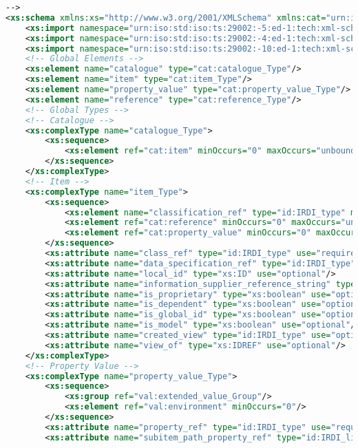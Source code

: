 \begin{lstlisting}[caption=catalogue.xsd, language=XML, label=lst:catalogue_xsd]
-->
<xs:schema xmlns:xs="http://www.w3.org/2001/XMLSchema" xmlns:cat="urn:iso:std:iso:ts:29002:-10:ed-1:tech:xml-schema:catalogue" xmlns:val="urn:iso:std:iso:ts:29002:-10:ed-1:tech:xml-schema:value" xmlns:bas="urn:iso:std:iso:ts:29002:-4:ed-1:tech:xml-schema:basic" xmlns:id="urn:iso:std:iso:ts:29002:-5:ed-1:tech:xml-schema:identifier" targetNamespace="urn:iso:std:iso:ts:29002:-10:ed-1:tech:xml-schema:catalogue" elementFormDefault="qualified">
	<xs:import namespace="urn:iso:std:iso:ts:29002:-5:ed-1:tech:xml-schema:identifier" schemaLocation="identifier.xsd"/>
	<xs:import namespace="urn:iso:std:iso:ts:29002:-4:ed-1:tech:xml-schema:basic" schemaLocation="basic.xsd"/>
	<xs:import namespace="urn:iso:std:iso:ts:29002:-10:ed-1:tech:xml-schema:value" schemaLocation="value.xsd"/>
	<!-- Global Elements -->
	<xs:element name="catalogue" type="cat:catalogue_Type"/>
	<xs:element name="item" type="cat:item_Type"/>
	<xs:element name="property_value" type="cat:property_value_Type"/>
	<xs:element name="reference" type="cat:reference_Type"/>
	<!-- Global Types -->
	<!-- Catalogue -->
	<xs:complexType name="catalogue_Type">
		<xs:sequence>
			<xs:element ref="cat:item" minOccurs="0" maxOccurs="unbounded"/>
		</xs:sequence>
	</xs:complexType>
	<!-- Item -->
	<xs:complexType name="item_Type">
		<xs:sequence>
			<xs:element name="classification_ref" type="id:IRDI_type" minOccurs="0" maxOccurs="unbounded"/>
			<xs:element ref="cat:reference" minOccurs="0" maxOccurs="unbounded"/>
			<xs:element ref="cat:property_value" minOccurs="0" maxOccurs="unbounded"/>
		</xs:sequence>
		<xs:attribute name="class_ref" type="id:IRDI_type" use="required"/>
		<xs:attribute name="data_specification_ref" type="id:IRDI_type" use="optional"/>
		<xs:attribute name="local_id" type="xs:ID" use="optional"/>
		<xs:attribute name="information_supplier_reference_string" type="xs:string" use="optional"/>
		<xs:attribute name="is_proprietary" type="xs:boolean" use="optional"/>
		<xs:attribute name="is_dependent" type="xs:boolean" use="optional"/>
		<xs:attribute name="is_global_id" type="xs:boolean" use="optional"/>
		<xs:attribute name="is_model" type="xs:boolean" use="optional"/>
		<xs:attribute name="created_view" type="id:IRDI_type" use="optional"/>
		<xs:attribute name="view_of" type="xs:IDREF" use="optional"/>
	</xs:complexType>
	<!-- Property Value -->
	<xs:complexType name="property_value_Type">
		<xs:sequence>
			<xs:group ref="val:extended_value_Group"/>
			<xs:element ref="val:environment" minOccurs="0"/>
		</xs:sequence>
		<xs:attribute name="property_ref" type="id:IRDI_type" use="required"/>
		<xs:attribute name="subitem_path_property_ref" type="id:IRDI_list_type" use="optional"/>

\end{lstlisting}
